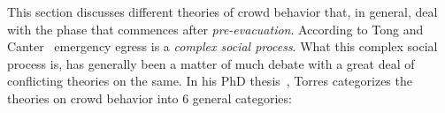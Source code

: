

This section discusses different theories of crowd behavior that, in general, deal with the phase that commences after \emph{pre-evacuation}. According to Tong and Canter~\cite{Tong:1985wn} emergency egress is a \emph{complex social process}. What this complex social process is, has generally been a matter of much debate with a great deal of conflicting theories on the same. In his PhD thesis~\cite{Torres:2010tj}, Torres categorizes the theories on crowd behavior into 6 general categories:

